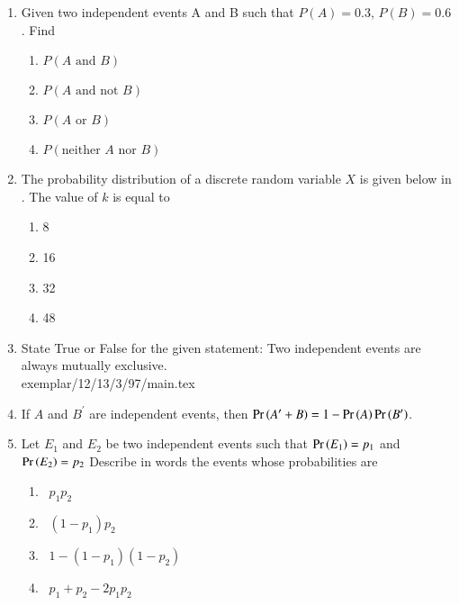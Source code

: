 \begin{enumerate}[label=\thesubsection.\arabic*,ref=\thesubsection.\theenumi,resume*]
\solution 

\item Given two independent events A and B such that $P(A) = 0.3$, $P(B) = 0.6$. Find
		\label{ncert/12/13/2/10}
		\vspace{-4mm}
\begin{multicols}{2}
\begin{enumerate}
\item $P(A\text{ and } B)$
\item $P(A \text{ and not } B)$
\item $P(A \text{ or } B)$
\item $P(\text{neither } A \text{ nor } B)$
\end{enumerate}
\end{multicols}
		\vspace{-3mm}
\item The probability distribution of a discrete random variable $X$ is given below
in .
	The value of $k$ is equal to
\begin{multicols}{4}
\begin{enumerate}
\item 8
\item 16
\item 32
\item 48
\end{enumerate}
\end{multicols}
\begin{table}[htb]
\centering

\caption{}
\label{tab:exemplar/12/13/3/87}
\end{table}
\solution

\item State True or False for the given statement:
Two independent events are always mutually exclusive.\\
\solution 
 {exemplar/12/13/3/97/main.tex}
\item If $A$ and $B^\prime$ are independent events, then $\Pr\left(A^\prime+B\right)=1-\Pr\left(A\right)\Pr\left(B^\prime\right)$.\\
\solution

\item Let $E_1$ and $E_2$ be two independent events such that $\Pr\left(E_1\right) = p_1 $ and $ \Pr\left(E_2\right) = p_2 $  Describe in words the events whose probabilities are
		\vspace{-3mm}
\begin{multicols}{2}
\begin{enumerate}
\item \ $p_1 p_2$
\quad\item \ $(1 - p_1) p_2 $
\quad\item \ $1 - (1 - p_1)(1 - p_2)$
\quad\item \ $p_1 + p_2 - 2p_1 p_2$
\end{enumerate}
\end{multicols}
		\vspace{-3mm}
\solution

\end{enumerate}
